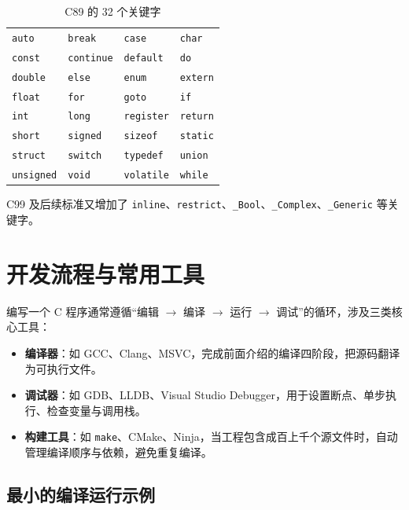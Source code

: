 \begin{table}[H]
\centering
\caption{C89 的 32 个关键字}
\label{tab:keywords}
\begin{tabular}{@{}l l l l@{}}
\toprule
\texttt{auto} & \texttt{break} & \texttt{case} & \texttt{char} \\
\texttt{const} & \texttt{continue} & \texttt{default} & \texttt{do} \\
\texttt{double} & \texttt{else} & \texttt{enum} & \texttt{extern} \\
\texttt{float} & \texttt{for} & \texttt{goto} & \texttt{if} \\
\texttt{int} & \texttt{long} & \texttt{register} & \texttt{return} \\
\texttt{short} & \texttt{signed} & \texttt{sizeof} & \texttt{static} \\
\texttt{struct} & \texttt{switch} & \texttt{typedef} & \texttt{union} \\
\texttt{unsigned} & \texttt{void} & \texttt{volatile} & \texttt{while} \\
\bottomrule
\end{tabular}
\end{table}

C99 及后续标准又增加了 \texttt{inline}、\texttt{restrict}、\texttt{\_Bool}、\texttt{\_Complex}、\texttt{\_Generic} 等关键字。

\section{开发流程与常用工具}

编写一个 C 程序通常遵循“编辑 $\to$ 编译 $\to$ 运行 $\to$ 调试”的循环，涉及三类核心工具：

\begin{itemize}
    \item \textbf{编译器}：如 GCC、Clang、MSVC，完成前面介绍的编译四阶段，把源码翻译为可执行文件。
    \item \textbf{调试器}：如 GDB、LLDB、Visual Studio Debugger，用于设置断点、单步执行、检查变量与调用栈。
    \item \textbf{构建工具}：如 \texttt{make}、CMake、Ninja，当工程包含成百上千个源文件时，自动管理编译顺序与依赖，避免重复编译。
\end{itemize}

\subsection{最小的编译运行示例}

